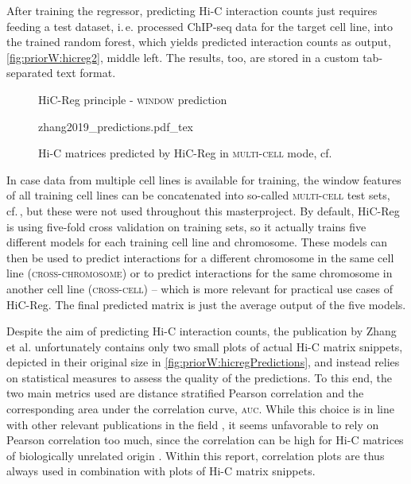 After training the regressor, predicting Hi-C interaction counts just requires feeding a test dataset, 
i.\,e. processed ChIP-seq data for the target cell line, into the trained random forest, 
which yields predicted interaction counts as output, \autoref{fig:priorW:hicreg2}, middle left. 
The results, too, are stored in a custom tab-separated text format.
\begin{figure}[p]
\centering
 \caption{HiC-Reg principle - \textsc{window} prediction}
 \label{fig:priorW:hicreg2}
\end{figure}
\begin{figure}[p]
\tiny
\centering
 {zhang2019_predictions.pdf_tex}
 \caption[Hi-C matrices predicted by HiC-Reg]{Hi-C matrices predicted by HiC-Reg in \textsc{multi-cell} mode, cf.\,\cite[p.\,9]{Zhang2019}}
 \label{fig:priorW:hicregPredictions}
\end{figure}

In case data from multiple cell lines is available for training,
the window features of all training cell lines can be concatenated into so-called \textsc{multi-cell} test sets, 
cf.\,\cite[Fig. 1]{Zhang2019}, but these were not used throughout this masterproject.
By default, HiC-Reg is using five-fold cross validation on training sets, 
so it actually trains five different models for each training cell line and chromosome.
These models can then be used to predict interactions for a different
chromosome in the same cell line (\textsc{cross-chromosome}) or to predict interactions for the same chromosome in 
another cell line (\textsc{cross-cell}) -- which is more relevant for practical use cases of HiC-Reg.
The final predicted matrix is just the average output of the five models.

Despite the aim of predicting Hi-C interaction counts, the publication by Zhang et al. unfortunately contains only two small plots 
of actual Hi-C matrix snippets, depicted in their original size in \autoref{fig:priorW:hicregPredictions}, 
and instead relies on statistical measures to assess the quality of the predictions.
To this end, the two main metrics used are distance stratified Pearson 
correlation and the corresponding area under the correlation curve, \textsc{auc}.
While this choice is in line with other relevant publications in the field \cite{Pierro2017, Farre2018, Schwessinger2019},
it seems unfavorable to rely on Pearson correlation too much, since the correlation can be high for Hi-C matrices
of biologically unrelated origin \cite{Yang2017}. 
Within this report, correlation plots are thus always used in combination with plots of Hi-C matrix snippets.

